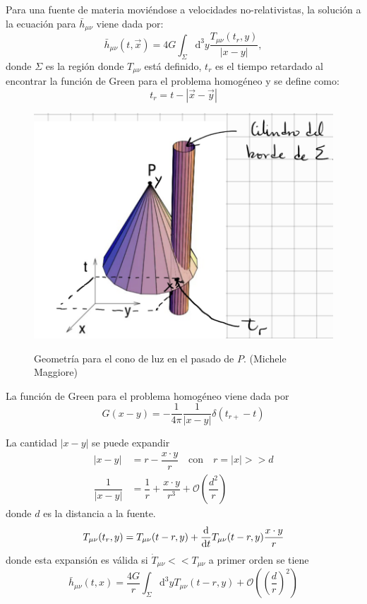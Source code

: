 \documentclass[../main]{subfiles}
\begin{document}
Para una fuente de materia moviéndose a velocidades no-relativistas, la solución a la ecuación para $\bar{h}_{\mu\nu}$ viene dada por:
\begin{equation}
    \bar{h}_{\mu\nu}(t, \vec{x})=4G\int_{\Sigma}\mathrm{d}^3 y \dfrac{T_{\mu\nu}(t_r, y)}{|x-y|},
\end{equation}
donde $\Sigma$ es la región donde $T_{\mu\nu}$ está definido, $t_r$ es el tiempo retardado al encontrar la función de Green para el problema homogéneo y se define como:
\begin{equation}
    t_r=t-|\vec{x}-\vec{y}|
\end{equation}
\begin{figure}[h]
    \centering
    \includegraphics[width=.7\textwidth]{img/imgRG8.2.PNG}
    \label{fig8.2}
    \caption{Geometría para el cono de luz en el pasado de $P$. (Michele Maggiore)}
\end{figure}

La función de Green para el problema homogéneo viene dada por 
\begin{equation}
    G(x-y)=-\dfrac{1}{4\pi} \dfrac{1}{|x-y|}\delta(t_{r+}-t)
\end{equation}

La cantidad $|x-y|$ se puede expandir 
\begin{equation}
    \begin{split}
        |x-y|&=r-\dfrac{x\cdot y}{r} \quad \text{con} \quad r=|x| >> d \\
        \dfrac{1}{|x-y|}&=\dfrac{1}{r}+\dfrac{x\cdot y}{r^3}+\mathcal{O}\left(\dfrac{d^2}{r}\right)
    \end{split}
\end{equation}
donde $d$ es la distancia a la fuente.
\begin{equation}
    T_{\mu\nu}(t_r, y)=T_{\mu\nu}(t-r, y)+\dv{}{t}T_{\mu\nu}(t-r, y)\dfrac{x\cdot y}{r}
\end{equation}
donde esta expansión es válida si $\dot{T}_{\mu\nu} << T_{\mu\nu}$ a primer orden se tiene 
\begin{equation}
    \bar{h}_{\mu\nu}(t, x)=\dfrac{4G}{r}\int_{\Sigma} \mathrm{d^3}y T_{\mu\nu}(t-r, y)+\mathcal{O}\left(\left(\dfrac{d}{r}\right)^2\right)
\end{equation}
\end{document}
